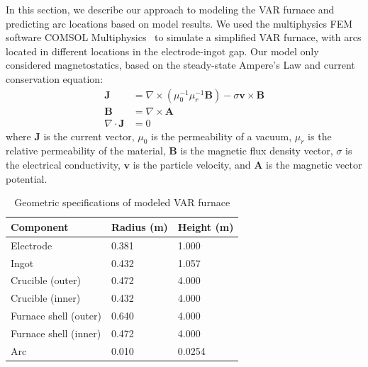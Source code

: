 \documentclass[onehalf,11pt]{beavtex}
\begin{document}
In this section, we describe our approach to modeling the VAR furnace and predicting arc locations based on model results.
We used the multiphysics FEM software COMSOL Multiphysics~\cite{COMSOL-4.3b} to simulate a simplified VAR furnace, with arcs located in different locations in the electrode-ingot gap.
Our model only considered magnetostatics, based on the steady-state Ampere's Law and current conservation equation:
\begin{align}
\mathbf{J} &= \nabla \times (\mu_0 ^{-1}\mu_r^{-1} \mathbf{B}) - \sigma \mathbf{v} \times \mathbf{B} \\
\mathbf{B} &= \nabla \times \mathbf{A} \\
\nabla \cdot \mathbf{J} &= 0 \;
\end{align}
where $\mathbf{J}$ is the current vector, $\mu_0$ is the permeability of a vacuum, $\mu_r$ is the relative permeability of the material, $\mathbf{B}$ is the magnetic flux density vector, $\sigma$ is the electrical conductivity, $\mathbf{v}$ is the particle velocity, and $\mathbf{A}$ is the magnetic vector potential.

\begin{table}[htbp]
\centering
\caption{Geometric specifications of modeled VAR furnace}
\begin{tabular}{@{}l l l@{}}
\toprule
	Component      & Radius (m)  & Height (m) \\
\midrule
	Electrode      & \num{0.381} & \num{1.000} \\
	Ingot          & \num{0.432} & \num{1.057} \\
	Crucible (outer) & \num{0.472} & \num{4.000} \\
	Crucible (inner) & \num{0.432} & \num{4.000} \\
	Furnace shell (outer) & \num{0.640} & \num{4.000} \\
	Furnace shell (inner) & \num{0.472} & \num{4.000} \\
	Arc            & \num{0.010} & \num{0.0254} \\
\bottomrule
\end{tabular}
\label{tab:geom}
\end{table}
\end{document}
